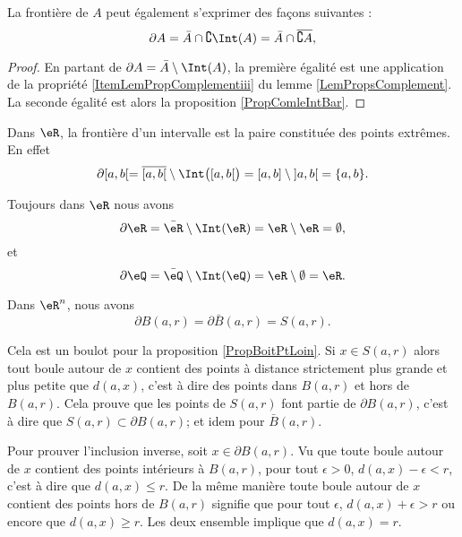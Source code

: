 \begin{lemma}
	La frontière de $A$ peut également s'exprimer des façons suivantes :
	\begin{equation}
		\partial A= \bar A\cap\complement\Int(A)=\bar A\cap\overline{ \complement A },
	\end{equation}
\end{lemma}

\begin{proof}
	En partant de $\partial A=\bar A\setminus \Int(A)$, la première égalité est une application de la propriété \ref{ItemLemPropComplementiii} du lemme \ref{LemPropsComplement}. La seconde égalité est alors la proposition \ref{PropComleIntBar}.
\end{proof}

\begin{example}
	Dans $\eR$, la frontière d'un intervalle est la paire constituée des points extrêmes. En effet
	\begin{equation}
		\partial\mathopen[ a , b [=\overline{ \mathopen[ a , b [ }\setminus\Int\big( \mathopen[ a , b [ \big)=\mathopen[ a , b \mathclose]\setminus\mathopen] a , b \mathclose[=\{ a,b \}.
	\end{equation}

	Toujours dans $\eR$ nous avons
	\begin{equation}
		\partial\eR=\bar\eR\setminus\Int(\eR)=\eR\setminus\eR=\emptyset,
	\end{equation}
	et
	\begin{equation}
		\partial\eQ=\bar\eQ\setminus\Int(\eQ)=\eR\setminus\emptyset=\eR.
	\end{equation}
\end{example}


\begin{example}
	Dans $\eR^n$, nous avons
	\begin{equation}
		\partial B(a,r)=\partial\bar B(a,r)=S(a,r).
	\end{equation}

    Cela est un boulot pour la proposition \ref{PropBoitPtLoin}. Si \( x\in S(a,r)\) alors tout boule autour de \( x\) contient des points à distance strictement plus grande et plus petite que \( d(a,x)\), c'est à dire des points dans \( B(a,r)\) et hors de \( B(a,r)\). Cela prouve que les points de \( S(a,r)\) font partie de \( \partial B(a,r)\), c'est à dire que \( S(a,r)\subset \partial B(a,r)\); et idem pour \( \bar B(a,r)\). 

Pour prouver l'inclusion inverse, soit \( x\in \partial B(a,r)\). Vu que toute boule autour de \( x\) contient des points intérieurs à \( B(a,r)\), pour tout \( \epsilon>0\), \( d(a,x)-\epsilon< r \), c'est à dire que \( d(a,x)\leq r\). De la même manière toute boule autour de \( x\) contient des points hors de \( B(a,r)\) signifie que pour tout \( \epsilon\), \( d(a,x)+\epsilon>r\) ou encore que \( d(a,x)\geq r\). Les deux ensemble implique que \( d(a,x)=r\).
\end{example}

